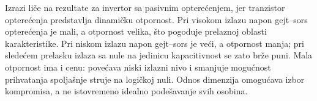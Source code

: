 Izrazi liče na rezultate za invertor sa pasivnim opterećenjem, jer tranzistor opterećenja predstavlja dinamičku otpornost. Pri visokom izlazu napon gejt–sors opterećenja je mali, a otpornost velika, što pogoduje prelaznoj oblasti karakteristike. Pri niskom izlazu napon gejt–sors je veći, a otpornost manja; pri sledećem prelasku izlaza sa nule na jedinicu kapacitivnost se zato brže puni. Mala otpornost ima i cenu: povećava niski izlazni nivo i smanjuje mogućnost prihvatanja spoljašnje struje na logičkoj nuli. Odnos dimenzija omogućava izbor kompromisa, a ne istovremeno idealno podešavanje svih osobina.
